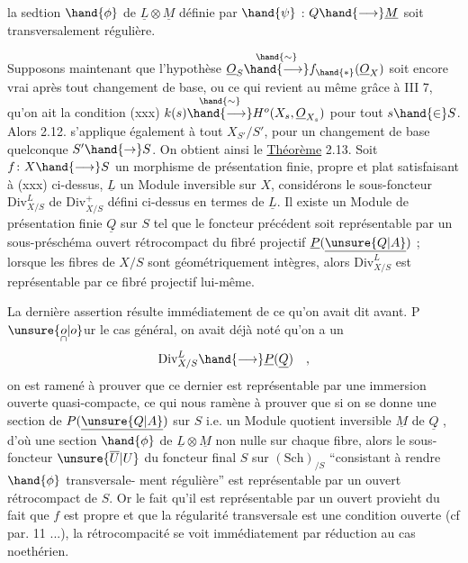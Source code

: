 
la sedtion $\hand{\phi}$ de $\underline{L}\otimes\underline{M}$ définie par $\hand{\psi}$ : $Q\hand{\longrightarrow}\underline{M}$ soit transversalement
régulière.

Supposons maintenant que l'hypothèse $\underline{O}_S\overset{\hand{\sim}}{\hand{\longrightarrow}}f_{\hand{*}}(\underline{O}_X)$ soit encore vrai
après tout changement de base, ou ce qui revient au même grâce à III 7,
qu'on ait la condition
(xxx) \qquad\qquad $k(s)\overset{\hand{\sim}}{\hand{\longrightarrow}}H^o(X_s,\underline{O}_{X_s})$
pour tout $s\hand{\in} S$. Alors 2.12. s'applique également à tout $X_{S'}/S'$, pour un
changement de base quelconque $S'\hand{\rightarrow} S$. On obtient ainsi le
\uline{Théorème} 2.13. Soit $f\colon X\hand{\longrightarrow} S$ un morphisme  de présentation finie,
propre et plat satisfaisant à (xxx) ci-dessus, $\underline{L}$ un Module inversible
sur $X$, considérons le sous-foncteur $\mathrm{Div}^{L}_{X/S}$ de $\mathrm{Div}^{+}_{X/S}$ défini ci-dessus en
termes de $\underline{L}$.  Il existe un Module de présentation finie $\underline{Q}$ sur
$S$ tel que le foncteur précédent soit représentable par un sous-préschéma
ouvert rétrocompact du fibré projectif $\underline{P}(\underline{\unsure{Q|A}})$ ; lorsque les fibres de $X/S$
sont géométriquement intègres, alors $\mathrm{Div}^{L}_{X/S}$ est représentable par ce
fibré  projectif lui-même.

La dernière assertion résulte immédiatement de ce qu'on avait dit
avant. P$\unsure{\underset{\cap}{o}|o}$ur le cas général, on avait déjà noté qu'on a un 
\[
\mathrm{Div}^{L}_{X/S}\hand{\longrightarrow}\underline{P}(\underline{Q}) \quad ,
\]
on est ramené à prouver que ce dernier est représentable par une immersion
ouverte quasi-compacte, ce qui nous ramène à prouver que si on se donne
une section de $P(\underline{\unsure{Q|A}})$ sur $S$ i.e. un Module quotient inversible $\underline{M}$ de $\underline{Q}$ ,
d'où une section $\hand{\phi}$ de $\underline{L}\otimes\underline{M}$ non nulle sur chaque fibre, alors le sous-foncteur
$\unsure{\overline{U}|U}$ du foncteur final $S$ sur $(\mathrm{Sch})_{/S}$ ``consistant à rendre $\hand{\phi}$ transversale-
ment régulière'' est représentable par un ouvert rétrocompact de $S$. Or
le fait qu'il est représentable par un ouvert provieht du fait que $f$ est
propre et que la régularité transversale est une condition ouverte (cf par.
11 ...), la rétrocompacité se voit immédiatement par réduction au cas
noethérien.

